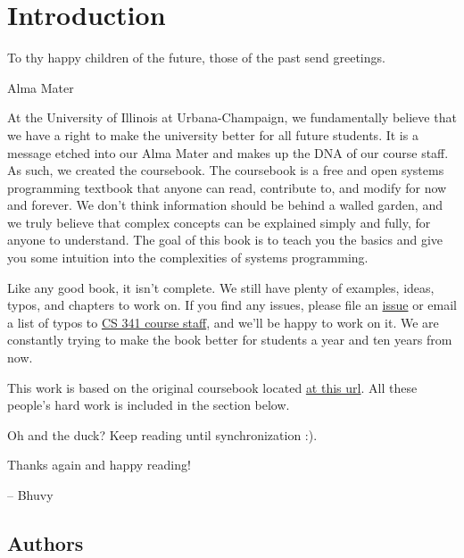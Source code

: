 \chapter{Introduction}

\epigraph{To thy happy children of the future, those of the past send greetings.}{Alma Mater}

At the University of Illinois at Urbana-Champaign, we fundamentally believe that we have a right to make the university better for all future students.
It is a message etched into our Alma Mater and makes up the DNA of our course staff.
As such, we created the coursebook.
The coursebook is a free and open systems programming textbook that anyone can read, contribute to, and modify for now and forever.
We don't think information should be behind a walled garden, and we truly believe that complex concepts can be explained simply and fully, for anyone to understand.
The goal of this book is to teach you the basics and give you some intuition into the complexities of systems programming.

Like any good book, it isn't complete.
We still have plenty of examples, ideas, typos, and chapters to work on.
If you find any issues, please file an \href{https://github.com/illinois-cs241/coursebook/issues}{issue} or email a list of typos to \href{http://cs341.cs.illinois.edu/staff}{CS 341 course staff}, and we'll be happy to work on it.
We are constantly trying to make the book better for students a year and ten years from now.

This work is based on the original coursebook located \href{https://github.com/angrave/SystemProgramming/wiki}{at this url}.
All these people's hard work is included in the section below.

Oh and the duck? Keep reading until synchronization :).

Thanks again and happy reading!

-- Bhuvy

\section{Authors}



